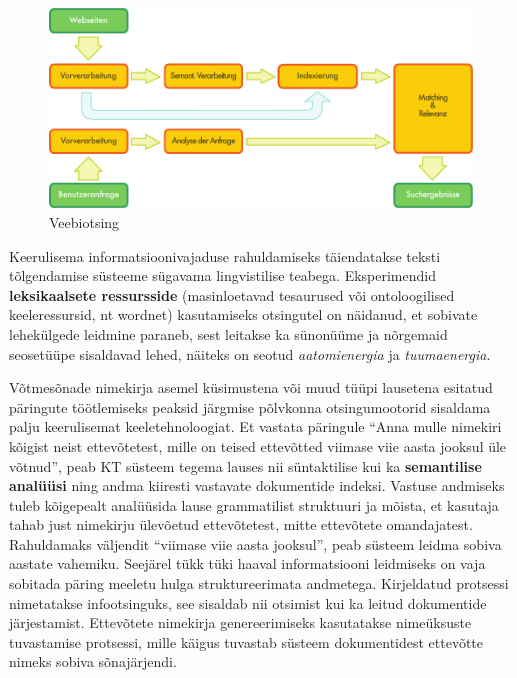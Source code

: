 \documentclass[]{../metanetpaper}
\begin{document}
\begin{multicols}{2}
\begin{figure}[htb]
  \center
  \includegraphics[width=\textwidth]{../_media/german/web_search_architecture}
  \caption{Veebiotsing}
  \label{fig:websearcharch_ee}
\end{figure}

Keerulisema informatsioonivajaduse rahuldamiseks täiendatakse teksti tõlgendamise süsteeme sügavama lingvistilise teabega. 
Eksperimendid \textbf{leksikaalsete ressursside} (masinloetavad tesaurused või ontoloogilised keeleressursid, nt wordnet) kasutamiseks otsingutel on näidanud, et sobivate lehekülgede leidmine paraneb, sest leitakse ka sünonüüme ja nõrgemaid seosetüüpe sisaldavad lehed, näiteks on seotud \textit{aatomienergia} ja \textit{tuumaenergia}. 

Võtmesõnade nimekirja asemel küsimustena või muud tüüpi lausetena esitatud päringute töötlemiseks peaksid järgmise põlvkonna otsingumootorid sisaldama palju keerulisemat keeletehnoloogiat. 
Et vastata päringule ``Anna mulle nimekiri kõigist neist ettevõtetest, mille on teised ettevõtted viimase viie aasta jooksul üle võtnud'', peab KT süsteem tegema lauses nii süntaktilise kui ka \textbf{semantilise analüüsi} ning andma kiiresti vastavate dokumentide indeksi. 
Vastuse andmiseks tuleb kõigepealt analüüsida lause grammatilist struktuuri ja mõista, et kasutaja tahab just nimekirju ülevõetud ettevõtetest, mitte ettevõtete omandajatest. 
Rahuldamaks väljendit ``viimase viie aasta jooksul'', peab süsteem leidma sobiva aastate vahemiku. 
Seejärel tükk tüki haaval informatsiooni leidmiseks on vaja sobitada päring meeletu hulga struktureerimata andmetega. 
Kirjeldatud protsessi nimetatakse infootsinguks, see sisaldab nii otsimist kui ka leitud dokumentide järjestamist. 
Ettevõtete nimekirja genereerimiseks kasutatakse nimeüksuste tuvastamise protsessi, mille käigus tuvastab süsteem dokumentidest ettevõtte nimeks sobiva sõnajärjendi. 



\end{multicols}
\end{document}
